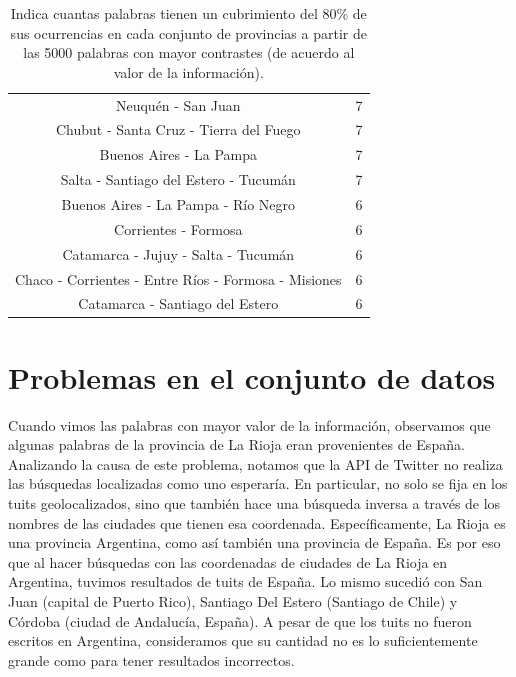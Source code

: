 \begin{table}
\begin{tabular}{|c|c|}
Neuquén - San Juan                                    & 7           \\ %
Chubut - Santa Cruz - Tierra del Fuego                 & 7           \\
Buenos Aires - La Pampa                                & 7           \\
Salta - Santiago del Estero - Tucumán                  & 7           \\
Buenos Aires - La Pampa - Río Negro                     & 6           \\
Corrientes - Formosa                                  & 6           \\
Catamarca - Jujuy - Salta - Tucumán                     & 6           \\
Chaco - Corrientes - Entre Ríos - Formosa - Misiones     & 6           \\
Catamarca - Santiago del Estero                       & 6           \\
\hline
\end{tabular}
\caption{Indica cuantas palabras tienen un cubrimiento del 80\% de sus ocurrencias en cada conjunto de provincias a partir de las 5000 palabras con mayor contrastes (de acuerdo al valor de la información).}
\label{tab:regiones}
\end{table}


\section{Problemas en el conjunto de datos}
\label{problemas_datos}

Cuando vimos las palabras con mayor valor de la información, observamos que algunas palabras de la provincia de La Rioja eran provenientes de España. Analizando la causa de este problema, notamos que la API de Twitter no realiza las búsquedas localizadas como uno esperaría. En particular, no solo se fija en los tuits geolocalizados, sino que también hace una búsqueda inversa a través de los nombres de las ciudades que tienen esa coordenada. Específicamente, La Rioja es una provincia Argentina, como así también una provincia de España. Es por eso que al hacer búsquedas con las coordenadas de ciudades de La Rioja en Argentina, tuvimos resultados de tuits de España. Lo mismo sucedió con San Juan (capital de Puerto Rico), Santiago Del Estero (Santiago de Chile) y Córdoba (ciudad de Andalucía, España). A pesar de que los tuits no fueron escritos en Argentina, consideramos que su cantidad no es lo suficientemente grande como para tener resultados incorrectos.

